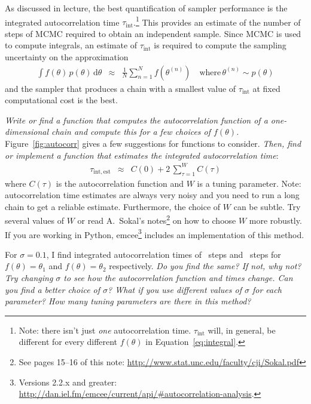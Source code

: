 \documentclass[letterpaper,12pt,preprint]{hack_aastex}
\newcommand{\question}{\emph}
\begin{document}
As discussed in lecture, the best quantification of sampler performance is the
integrated autocorrelation time $\tau_\mathrm{int}$.\footnote{Note: there isn't
just \emph{one} autocorrelation time.
$\tau_\mathrm{int}$ will, in general, be different for every different
$f(\theta)$ in Equation~\ref{eq:integral}.}
This provides an estimate of the number of steps of MCMC required to obtain an
independent sample.
Since MCMC is used to compute integrals, an estimate of $\tau_\mathrm{int}$ is
required to compute the sampling uncertainty on the approximation
\begin{eqnarray}\label{eq:integral}
\int f(\theta)\,p(\theta)\,\mathrm{d}\theta &\approx&
    \frac{1}{N} \sum_{n=1}^N f(\theta^{(n)}) \quad
    \mathrm{where}\,\theta^{(n)} \sim p(\theta)
\end{eqnarray}
and the sampler that produces a chain with a smallest value of
$\tau_\mathrm{int}$ at fixed computational cost is the best.

\question{Write or find a function that computes the autocorrelation function
of a one-dimensional chain and compute this for a few choices of $f(\theta)$.}
Figure~\ref{fig:autocorr} gives a few suggestions for functions to consider.
\question{Then, find or implement a function that estimates the integrated
autocorrelation time}:
\begin{eqnarray}
\tau_\mathrm{int,est} &\approx& C(0) + 2\,\sum_{\tau=1}^W C(\tau)
\end{eqnarray}
where $C(\tau)$ is the autocorrelation function and $W$ is a tuning parameter.
Note: autocorrelation time estimates are always very noisy and you need to run
a long chain to get a reliable estimate.
Furthermore, the choice of $W$ can be subtle. Try several values of $W$ or
read A.~Sokal's notes\footnote{See pages 15--16 of this note:
\url{http://www.stat.unc.edu/faculty/cji/Sokal.pdf}} on how to choose $W$ more
robustly.
If you are working in Python, \textsf{emcee}\footnote{Versions 2.2.x and
greater: \url{http://dan.iel.fm/emcee/current/api/\#autocorrelation-analysis}.}
includes an implementation of this method.

For $\sigma = 0.1$, I find integrated autocorrelation times of \taua~steps and
\taub~steps for $f(\theta)=\theta_1$ and $f(\theta)=\theta_2$ respectively.
\question{Do you find the same? If not, why not?
Try changing $\sigma$ to see how the autocorrelation function and times
change.
Can you find a better choice of $\sigma$? What if you use different values of
$\sigma$ for each parameter? How many tuning parameters are there in this
method?}
\end{document}
